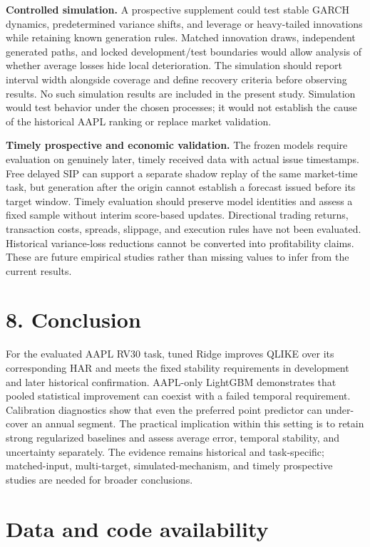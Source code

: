 \textbf{Controlled simulation.} A prospective supplement could test
stable GARCH dynamics, predetermined variance shifts, and leverage or
heavy-tailed innovations while retaining known generation rules. Matched
innovation draws, independent generated paths, and locked
development/test boundaries would allow analysis of whether average
losses hide local deterioration. The simulation should report interval
width alongside coverage and define recovery criteria before observing
results. No such simulation results are included in the present study.
Simulation would test behavior under the chosen processes; it would not
establish the cause of the historical AAPL ranking or replace market
validation.

\textbf{Timely prospective and economic validation.} The frozen models
require evaluation on genuinely later, timely received data with actual
issue timestamps. Free delayed SIP can support a separate shadow replay
of the same market-time task, but generation after the origin cannot
establish a forecast issued before its target window. Timely evaluation
should preserve model identities and assess a fixed sample without
interim score-based updates. Directional trading returns, transaction
costs, spreads, slippage, and execution rules have not been evaluated.
Historical variance-loss reductions cannot be converted into
profitability claims. These are future empirical studies rather than
missing values to infer from the current results.

\section{8. Conclusion}\label{conclusion}

For the evaluated AAPL RV30 task, tuned Ridge improves QLIKE over its
corresponding HAR and meets the fixed stability requirements in
development and later historical confirmation. AAPL-only LightGBM
demonstrates that pooled statistical improvement can coexist with a
failed temporal requirement. Calibration diagnostics show that even the
preferred point predictor can under-cover an annual segment. The
practical implication within this setting is to retain strong
regularized baselines and assess average error, temporal stability, and
uncertainty separately. The evidence remains historical and
task-specific; matched-input, multi-target, simulated-mechanism, and
timely prospective studies are needed for broader conclusions.

\section{Data and code availability}\label{data-and-code-availability}

